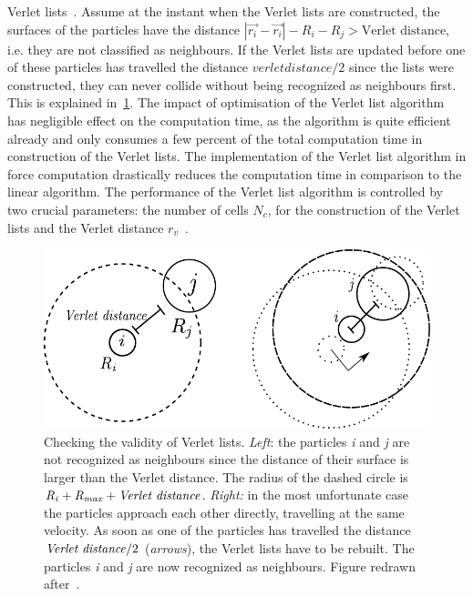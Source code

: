 Verlet 
lists~\citep{Posch2005}. Assume at the instant when the Verlet lists are 
constructed, the surfaces 
of the particles have the distance $\left| \overrightarrow{r_{\mathit{i}}} - 
\overrightarrow{r_{\mathit{i}}}\right| - 
\mathit{R}_{\mathit{i}}-\mathit{R}_{\mathit{j}} > 
\mbox{Verlet distance}
$, i.e. they are not classified as neighbours. If the 
Verlet lists are 
updated before one of these particles has travelled the distance 
$\mathit{verlet distance}/2$ 
since 
the lists were constructed, they can never collide without being recognized as 
neighbours first. 
This is explained in~\cref{fig:Verlet}. The impact of optimisation of the 
Verlet list 
algorithm has negligible effect on the computation time, as the algorithm is 
quite efficient 
already and only consumes a few percent of the total computation time in 
construction of the 
Verlet 
lists. The implementation of the Verlet list algorithm in force computation 
drastically reduces 
the 
computation time in comparison to the linear algorithm. The performance of the 
Verlet list 
algorithm is controlled by two crucial parameters: the number of cells 
$\mathit{N}_{\mathit{c}}$, 
for the construction of the Verlet lists and the Verlet distance 
$r_{\mathit{v}}$~\citep{Posch2005}.

\begin{figure}[htbp]
\centering
\includegraphics{Verlet}
\caption[Checking the validity of Verlet list]{Checking the validity of Verlet 
lists. 
\textit{Left}: the particles \textit{i} and \textit{j} are not recognized as 
neighbours since the 
distance of their surface is larger than the Verlet distance. The radius of 
the dashed circle is 
$\mathit{R}_{\mathit{i}}+\mathit{R}_{\mathit{max}}+\mbox{\textit{Verlet 
distance}}$. 
\textit{Right:} in the most unfortunate case the particles approach each other 
directly, 
travelling 
at the same velocity. As soon as one of the particles has travelled the 
distance $\mbox{\textit{Verlet distance}}/2$ (\textit{arrows}), the Verlet 
lists have 
to be rebuilt. The 
particles \textit{i} and \textit{j} are now recognized as neighbours. Figure 
redrawn after~\citet{Posch2005}.}
\label{fig:Verlet}
\end{figure}


